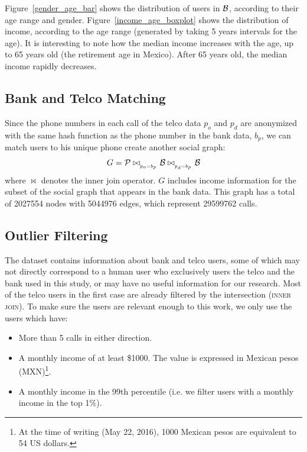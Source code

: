 Figure~\ref{gender_age_bar} shows the distribution of users in $\mathcal{B}$, according to
their age range and gender.
Figure~\ref{income_age_boxplot} shows the distribution of income, according to the age range (generated by taking 5 years intervals for the age).
It is interesting to note how the median income increases with the age, up to 65 years old (the retirement age in Mexico). After 65 years old, the median income rapidly decreases.


\subsection{Bank and Telco Matching}

Since the phone numbers in each call of the telco data $ p_o $ and $ p_d $ are anonymized with the same hash function as the phone number in the bank data, $ b_p $, we can match users to his unique phone create another social graph: 
$$ G = \mathcal{P} \bowtie_{_{p_o = b_p}} \mathcal{B} \bowtie_{_{p_d = b_p}} \mathcal{B} $$ 
where $\bowtie$ denotes the inner join operator.
$G$ includes income information for the subset of the social graph that appears in the bank data.
This graph has a total of \num{2027554} nodes with \num{5044976} edges, which represent \num{29599762} calls. %

\subsection{Outlier Filtering}

The dataset contains information about bank and telco users, some of which may not directly correspond to a human user who exclusively users the telco and the bank used in this study, or may have no useful information for our research. Most of the telco users in the first case are already filtered by the intersection (\textsc{inner join}). To make sure the users are relevant enough to this work, we only use the users which have:

\begin{itemize}
	\item More than 5 calls in either direction.
	\item A monthly income of at least \$\num{1000}.
	The value is expressed in Mexican pesos (MXN)\footnote{At the time of writing (May 22, 2016), 1000 Mexican pesos are equivalent to 54 US dollars.}.
	\item A monthly income in the \num{99}th percentile
	(i.e. we filter users with a monthly income in the top 1\%).
\end{itemize}
